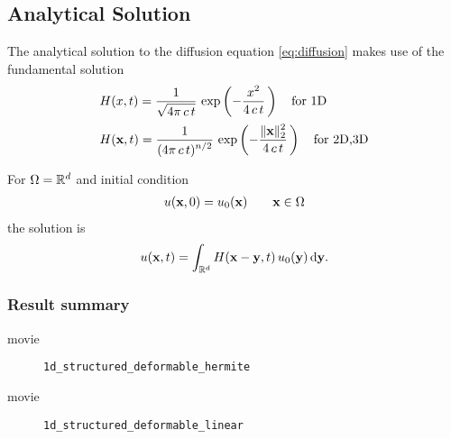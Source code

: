 \subsection{Analytical Solution}
The analytical solution to the diffusion equation \eqref{eq:diffusion} makes use of the fundamental solution
\begin{equation*}
  \begin{array}{lll}
    H(x,t) = \displaystyle\frac{\displaystyle{1}}{\displaystyle{\sqrt{4\pi\,c\,t}}}\,\exp\left(-\displaystyle\frac{\displaystyle{x^2}}{\displaystyle{4\,c\,t}}\,\right) \quad \text{for 1D}\\[4mm]
    H(\textbf{x},t) = \displaystyle\frac{\displaystyle{1}}{\displaystyle{(4\pi\,c\,t)^{n/2}}}\,\exp\left(-\displaystyle\frac{\displaystyle{\Vert \textbf{x}\Vert_2^2}}{\displaystyle{4\,c\,t}}\,\right) \quad \text{for 2D,3D}\\[4mm]
  \end{array}
\end{equation*}
For $\Omega=\mathbb{R}^d$ and initial condition
\begin{equation*}
  \begin{array}{lll}
    u(\textbf{x},0) = u_0(\textbf{x})\qquad \textbf{x} \in \Omega
  \end{array}
\end{equation*}
the solution is
\begin{equation*}
  \begin{array}{lll}
    u(\bfx,t) = \ds\int_{\R^d} H(\bfx - \bfy,t)\,u_0(\bfy)\,\d \bfy.
  \end{array}
\end{equation*}

\subsubsection{Result summary}
%
%
\begin{frame}{movie}
  \begin{figure}[h!]
    \caption{\lstinline{1d_structured_deformable_hermite}}
  \end{figure} 
\end{frame}



%
\begin{frame}{movie}
  \begin{figure}[h!]
    \caption{\lstinline{1d_structured_deformable_linear}}
  \end{figure} 
\end{frame}

